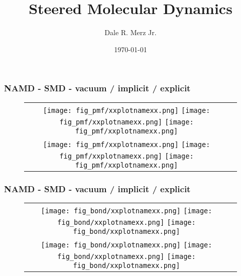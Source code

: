 \documentclass[9pt]{beamer} %
\title[]{Steered Molecular Dynamics}
\author{Dale R. Merz Jr.}
\institute[Ga Tech]
{ Georgia Institute of Technology \\
  \medskip {\emph{dmerz3@gatech.edu}} }
\date{\today}
\begin{document}
\begin{frame}
\frametitle{NAMD - SMD - vacuum / implicit / explicit}
{}
\begin{figure}
\begin{tabular}{cc}
\hspace*{-1cm}
\texttt{[image: fig\_pmf/xxplotnamexx.png]}
\texttt{[image: fig\_pmf/xxplotnamexx.png]}
\texttt{[image: fig\_pmf/xxplotnamexx.png]} \\
\hspace*{-1cm}
\texttt{[image: fig\_pmf/xxplotnamexx.png]}
\texttt{[image: fig\_pmf/xxplotnamexx.png]}
\texttt{[image: fig\_pmf/xxplotnamexx.png]} \\
\end{tabular}
\end{figure}
\end{frame}
\begin{frame}
\frametitle{NAMD - SMD - vacuum / implicit / explicit}
{}
\begin{figure}
\begin{tabular}{cc}
\hspace*{-1cm}
\texttt{[image: fig\_bond/xxplotnamexx.png]}
\texttt{[image: fig\_bond/xxplotnamexx.png]}
\texttt{[image: fig\_bond/xxplotnamexx.png]} \\
\hspace*{-1cm}
\texttt{[image: fig\_bond/xxplotnamexx.png]}
\texttt{[image: fig\_bond/xxplotnamexx.png]}
\texttt{[image: fig\_bond/xxplotnamexx.png]} \\
\end{tabular}
\end{figure}
\end{frame}
%
% 
\end{document}
